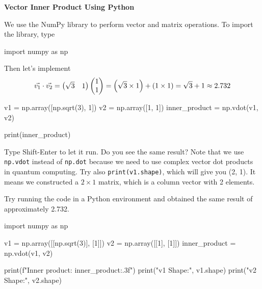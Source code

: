 \documentclass[a4paper, 10pt]{article}
\begin{document}
\begin{problem}
\textbf{Vector Inner Product Using Python}
\par We use the NumPy library to perform vector and matrix operations. To import the library, type

\begin{codingbox}
import numpy as np
\end{codingbox}

Then let's implement
\[
	\vec{v_1} \cdot \vec{v_2}
	= \begin{pmatrix}\sqrt{3} & 1\end{pmatrix} \begin{pmatrix}1 \\ 1\end{pmatrix}
	= \left(\sqrt{3} \times 1\right) + \left(1 \times 1\right)
	= \sqrt{3} + 1
	\approx 2.732
\]

\begin{codingbox}
v1 = np.array([np.sqrt(3), 1])
v2 = np.array([1, 1])
inner_product = np.vdot(v1, v2)

print(inner_product)
\end{codingbox}

Type Shift-Enter to let it run. Do you see the same result?
Note that we use \texttt{np.vdot} instead of \texttt{np.dot} because we need to use complex vector dot products in quantum computing.
Try also \texttt{print(v1.shape)}, which will give you (2, 1).
It means we constructed a \( 2 \times 1 \) matrix, which is a column vector with 2 elements.
\end{problem}

\begin{solution}
	Try running the code in a Python environment and obtained the same result of approximately 2.732.

	\begin{codingbox}
import numpy as np

v1 = np.array([[np.sqrt(3)], [1]])
v2 = np.array([[1], [1]])
inner_product = np.vdot(v1, v2)

print(f"Inner product: {inner_product:.3f}")
print("v1 Shape:", v1.shape)
print("v2 Shape:", v2.shape)
\end{codingbox}

\end{solution}
\end{document}
